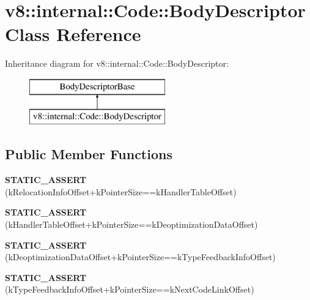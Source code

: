 \hypertarget{classv8_1_1internal_1_1_code_1_1_body_descriptor}{}\section{v8\+:\+:internal\+:\+:Code\+:\+:Body\+Descriptor Class Reference}
\label{classv8_1_1internal_1_1_code_1_1_body_descriptor}
Inheritance diagram for v8\+:\+:internal\+:\+:Code\+:\+:Body\+Descriptor\+:\begin{figure}[H]
\begin{center}
\leavevmode
\includegraphics[height=2.000000cm]{classv8_1_1internal_1_1_code_1_1_body_descriptor}
\end{center}
\end{figure}
\subsection*{Public Member Functions}
\begin{DoxyCompactItemize}
\item 
{\bfseries S\+T\+A\+T\+I\+C\+\_\+\+A\+S\+S\+E\+RT} (k\+Relocation\+Info\+Offset+k\+Pointer\+Size==k\+Handler\+Table\+Offset)\hypertarget{classv8_1_1internal_1_1_code_1_1_body_descriptor_afa9d27a9d2ebb1ded37e55c25c1bfda7}{}\label{classv8_1_1internal_1_1_code_1_1_body_descriptor_afa9d27a9d2ebb1ded37e55c25c1bfda7}

\item 
{\bfseries S\+T\+A\+T\+I\+C\+\_\+\+A\+S\+S\+E\+RT} (k\+Handler\+Table\+Offset+k\+Pointer\+Size==k\+Deoptimization\+Data\+Offset)\hypertarget{classv8_1_1internal_1_1_code_1_1_body_descriptor_a36905cc9eaea173798574c86620047e1}{}\label{classv8_1_1internal_1_1_code_1_1_body_descriptor_a36905cc9eaea173798574c86620047e1}

\item 
{\bfseries S\+T\+A\+T\+I\+C\+\_\+\+A\+S\+S\+E\+RT} (k\+Deoptimization\+Data\+Offset+k\+Pointer\+Size==k\+Type\+Feedback\+Info\+Offset)\hypertarget{classv8_1_1internal_1_1_code_1_1_body_descriptor_a3feb3a2fbbe14918791aa5e4ab4e2174}{}\label{classv8_1_1internal_1_1_code_1_1_body_descriptor_a3feb3a2fbbe14918791aa5e4ab4e2174}

\item 
{\bfseries S\+T\+A\+T\+I\+C\+\_\+\+A\+S\+S\+E\+RT} (k\+Type\+Feedback\+Info\+Offset+k\+Pointer\+Size==k\+Next\+Code\+Link\+Offset)\hypertarget{classv8_1_1internal_1_1_code_1_1_body_descriptor_a6bf6c1f38e168384f65174530ad84153}{}\label{classv8_1_1internal_1_1_code_1_1_body_descriptor_a6bf6c1f38e168384f65174530ad84153}

\end{DoxyCompactItemize}
